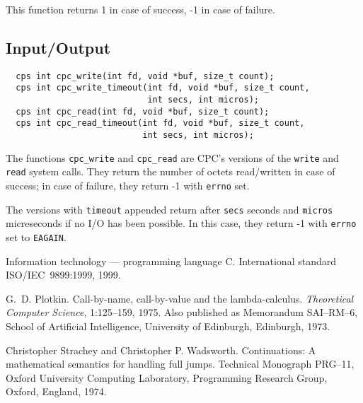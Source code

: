 \documentclass[a4paper]{report}
\begin{document}
This function returns 1 in case of success, -1 in case of failure.

\subsection{Input/Output}
\begin{verbatim}
  cps int cpc_write(int fd, void *buf, size_t count);
  cps int cpc_write_timeout(int fd, void *buf, size_t count,
                            int secs, int micros);
  cps int cpc_read(int fd, void *buf, size_t count);
  cps int cpc_read_timeout(int fd, void *buf, size_t count,
                           int secs, int micros);
\end{verbatim}

The functions \verb|cpc_write| and \verb|cpc_read| are CPC's versions
of the \verb|write| and \verb|read| system calls.  They return the
number of octets read/written in case of success; in case of failure,
they return -1 with \verb|errno| set.

The versions with \verb|timeout| appended return after \verb|secs|
seconds and \verb|micros| micreseconds if no I/O has been possible.
In this case, they return -1 with \verb|errno| set to \verb|EAGAIN|.

\begin{thebibliography}{MTHM90}

Information technology --- programming language {C}.
International standard ISO/IEC~9899:1999, 1999.

G.~D. Plotkin.
Call-by-name, call-by-value and the lambda-calculus.
{\em Theoretical Computer Science}, 1:125--159, 1975.
Also published as Memorandum SAI--RM--6, School of Artificial
  Intelligence, University of Edinburgh, Edinburgh, 1973.

Christopher Strachey and Christopher P. Wadsworth.
Continuations: A mathematical semantics for handling full jumps.
Technical Monograph PRG--11, Oxford University Computing
Laboratory, Programming Research Group, Oxford, England, 1974.

\end{thebibliography}
\end{document}
